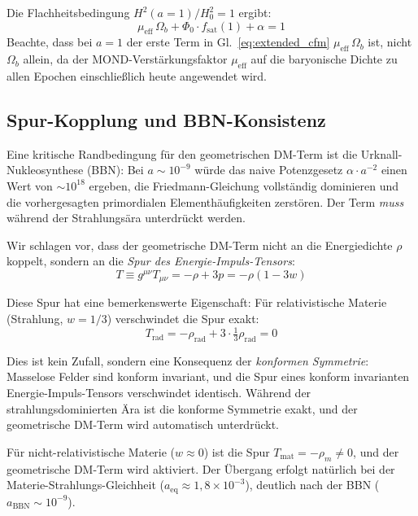 \documentclass[aps,prd,twocolumn,superscriptaddress,nofootinbib]{revtex4-2}
\begin{document}
Die Flachheitsbedingung $H^2(a{=}1)/H_0^2 = 1$ ergibt:
\begin{equation}
\mu_{\mathrm{eff}}\,\Omega_b + \Phi_0 \cdot f_{\mathrm{sat}}(1) + \alpha = 1
\end{equation}
Beachte, dass bei $a=1$ der erste Term in Gl.~\eqref{eq:extended_cfm} $\mu_{\mathrm{eff}}\,\Omega_b$ ist, nicht $\Omega_b$ allein, da der MOND-Verst\"arkungsfaktor $\mu_{\mathrm{eff}}$ auf die baryonische Dichte zu allen Epochen einschließlich heute angewendet wird.

\subsection{Spur-Kopplung und BBN-Konsistenz}
\label{subsec:trace_coupling}

Eine kritische Randbedingung f\"ur den geometrischen DM-Term ist die Urknall-Nukleosynthese (BBN): Bei $a \sim 10^{-9}$ w\"urde das naive Potenzgesetz $\alpha \cdot a^{-2}$ einen Wert von $\sim 10^{18}$ ergeben, die Friedmann-Gleichung vollst\"andig dominieren und die vorhergesagten primordialen Elementh\"aufigkeiten zerst\"oren. Der Term \textit{muss} w\"ahrend der Strahlungs\"ara unterdr\"uckt werden.

Wir schlagen vor, dass der geometrische DM-Term nicht an die Energiedichte $\rho$ koppelt, sondern an die \textit{Spur des Energie-Impuls-Tensors}:
\begin{equation}
T \equiv g^{\mu\nu} T_{\mu\nu} = -\rho + 3p = -\rho(1 - 3w)
\end{equation}

Diese Spur hat eine bemerkenswerte Eigenschaft: F\"ur relativistische Materie (Strahlung, $w = 1/3$) verschwindet die Spur exakt:
\begin{equation}
T_{\mathrm{rad}} = -\rho_{\mathrm{rad}} + 3 \cdot \tfrac{1}{3}\rho_{\mathrm{rad}} = 0
\end{equation}

Dies ist kein Zufall, sondern eine Konsequenz der \textit{konformen Symmetrie}: Masselose Felder sind konform invariant, und die Spur eines konform invarianten Energie-Impuls-Tensors verschwindet identisch. W\"ahrend der strahlungsdominierten \"Ara ist die konforme Symmetrie exakt, und der geometrische DM-Term wird automatisch unterdr\"uckt.

F\"ur nicht-relativistische Materie ($w \approx 0$) ist die Spur $T_{\mathrm{mat}} = -\rho_m \neq 0$, und der geometrische DM-Term wird aktiviert. Der \"Ubergang erfolgt nat\"urlich bei der Materie-Strahlungs-Gleichheit ($a_{\mathrm{eq}} \approx 1{,}8 \times 10^{-3}$), deutlich nach der BBN ($a_{\mathrm{BBN}} \sim 10^{-9}$).
\end{document}
